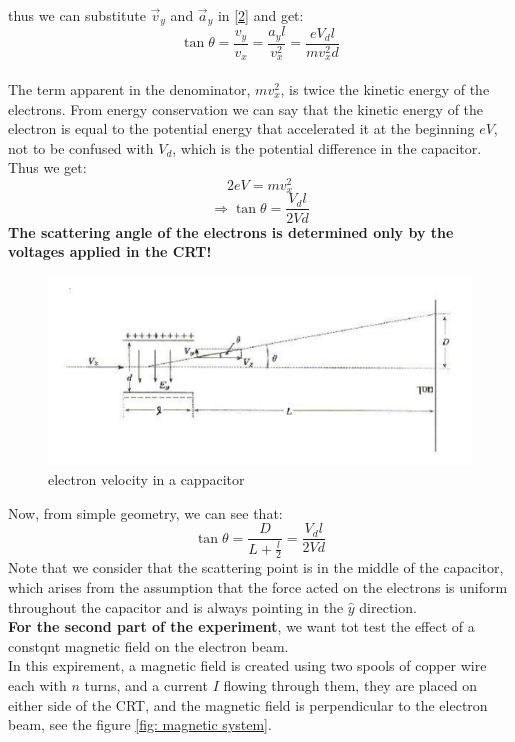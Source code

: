 \documentclass[12pt]{article}
\begin{document}
thus we can substitute $\vec{v}_y$ and $\vec{a}_y$ in \eqref{2} and get: 
\begin{equation} 
    \tan{\theta} = \frac{v_y}{v_x} = \frac{a_y l}{v_x^2} = \frac{eV_d l }{m v_x^2 d}
\end{equation}\\
The term apparent in the denominator, $mv_x^2$, is twice the kinetic energy of the electrons. From energy conservation we can say that the kinetic energy of the electron is equal to the potential energy that accelerated it at the beginning $eV$, not to be confused with $V_d$, which is the potential difference in the capacitor.
Thus we get: 
$$2eV = mv_x^2$$
\begin{equation} 
   \Rightarrow \tan{\theta} = \frac{V_d l }{2Vd}
\end{equation}
\textbf{The scattering angle of the electrons is determined only by the voltages applied in the CRT!}

\begin{figure}[h]
    \centering
    \includegraphics[width=0.5\linewidth]{electron velocity in a cappacitor.png}
    \caption{electron velocity in a cappacitor}
    \label{fig: electron velocity in a cappacitor}
\end{figure} 

Now, from simple geometry, we can see that: 
\begin{equation} \label{final theta}
    \tan{\theta} = \frac{D}{L + \frac l 2} = \frac{V_d l }{2Vd}
\end{equation}
Note that we consider that the scattering point is in the middle of the capacitor, which arises from the assumption that the force acted on the electrons is uniform throughout the capacitor and is always pointing in the $\hat y $ direction. \\

\textbf{For the second part of the experiment}, we want tot test the effect of a constqnt magnetic field on the electron beam.\\

In this expirement, a magnetic field is created using two spools of copper wire each with $n$ turns, and a current $I$ flowing through them, they are placed on either side of the CRT, and the magnetic field is perpendicular to the electron beam, see the figure \ref{fig: magnetic system}.\\
\end{document}
